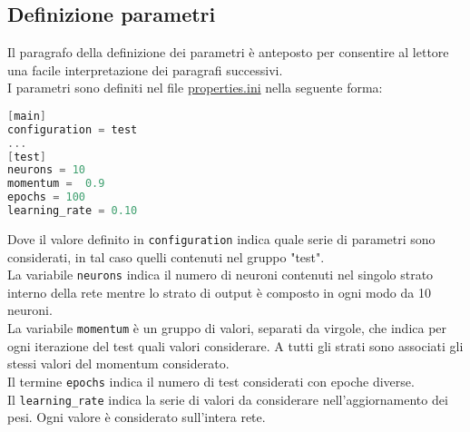 \subsection{Definizione parametri}
Il paragrafo della definizione dei parametri è anteposto per consentire al lettore una facile interpretazione dei paragrafi successivi. \\
I parametri sono definiti nel file \underline{properties.ini} nella seguente forma:
\begin{lstlisting}[language=C]
[main]
configuration = test
...
[test]
neurons = 10
momentum =  0.9
epochs = 100
learning_rate = 0.10
\end{lstlisting}
Dove il valore definito in \texttt{configuration} indica quale serie di parametri sono considerati, in tal caso quelli contenuti nel gruppo "test". \\
La variabile \texttt{neurons} indica il numero di neuroni contenuti nel singolo strato interno della rete mentre lo strato di output è composto in ogni modo da 10 neuroni.\\
La variabile \texttt{momentum} è un gruppo di valori, separati da virgole, che indica per ogni iterazione del test quali valori considerare. A tutti gli strati sono associati gli stessi valori del momentum considerato. \\
Il termine \texttt{epochs} indica il numero di test considerati con epoche diverse. \\
Il \texttt{learning\_rate} indica la serie di valori da considerare nell'aggiornamento dei pesi. Ogni valore è considerato sull'intera rete. \\

